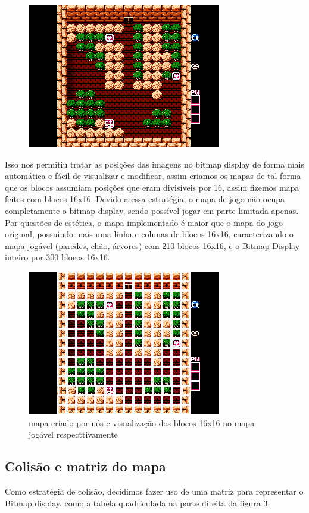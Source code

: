 \documentclass[10pt, conference, compsocconf]{IEEEtran}
\begin{document}
\begin{figure}[htb]
  \begin{center}
   \includegraphics[width=0.3\linewidth]{./Figures/image_5.png}
  \end{center}
  \label{fig:01}
\end{figure}

Isso nos permitiu tratar as posições das imagens no
bitmap display de forma mais automática e fácil de
visualizar e modificar, assim criamos os mapas de tal
forma que os blocos assumiam posições que eram divisíveis por 16, assim fizemos mapa feitos com blocos
16x16. Devido a essa estratégia, o mapa de jogo não
ocupa completamente o bitmap display, sendo possível jogar em parte limitada apenas. Por questões de
estética, o mapa implementado é maior que o mapa
do jogo original, possuindo mais uma linha e colunas de blocos 16x16, caracterizando o mapa jogável
(paredes, chão, árvores) com 210 blocos 16x16, e o
Bitmap Display inteiro por 300 blocos 16x16.

\begin{figure}[htb]
  \begin{center}
   \includegraphics[width=0.3\linewidth]{./Figures/image_6.png}
  \end{center}
  \caption{ mapa criado por nós e visualização dos
blocos 16x16 no mapa jogável respecttivamente}
  \label{fig:01}
\end{figure}


\subsection{Colisão e matriz do mapa}{
\label{sec:Mars}
Como estratégia de colisão, decidimos fazer uso de
uma matriz para representar o Bitmap display, como
a tabela quadriculada na parte direita da figura 3.

}
\end{document}
